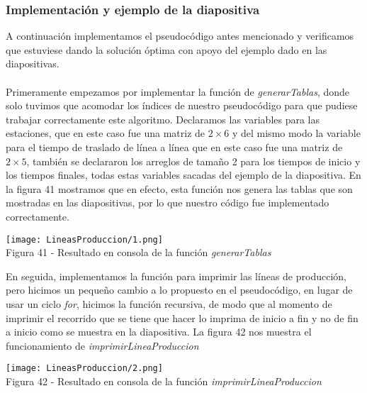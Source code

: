 \documentclass[12pt,twoside]{article}
\begin{document}
\subsubsection{Implementación y ejemplo de la diapositiva}
A continuación implementamos el pseudocódigo antes mencionado y verificamos que estuviese dando la solución óptima con apoyo del ejemplo dado en las diapositivas.\\\\
Primeramente empezamos por implementar la función de \textit{generarTablas}, donde solo tuvimos que acomodar los índices de nuestro pseudocódigo para que pudiese trabajar correctamente este algoritmo. Declaramos las variables para las estaciones, que en este caso fue una matriz de $2\times6$ y del mismo modo la variable para el tiempo de traslado de línea a línea que en este caso fue una matriz de $2\times5$, también se declararon los arreglos de tamaño 2 para los tiempos de inicio y los tiempos finales, todas estas variables sacadas del ejemplo de la diapositiva. En la figura 41 mostramos que en efecto, esta función nos genera las tablas que son mostradas en las diapositivas, por lo que nuestro código fue implementado correctamente.
\begin{center}
    \texttt{[image: LineasProduccion/1.png]}\\
    Figura 41 - Resultado en consola de la función \textit{generarTablas}
\end{center}
En seguida, implementamos la función para imprimir las líneas de producción, pero hicimos un pequeño cambio a lo propuesto en el pseudocódigo, en lugar de usar un ciclo \textit{for}, hicimos la función recursiva, de modo que al momento de imprimir el recorrido que se tiene que hacer lo imprima de inicio a fin y no de fin a inicio como se muestra en la diapositiva. La figura 42 nos muestra el funcionamiento de \textit{imprimirLineaProduccion}
\begin{center}
    \texttt{[image: LineasProduccion/2.png]}\\
    Figura 42 - Resultado en consola de la función \textit{imprimirLineaProduccion}
\end{center}
\end{document}
